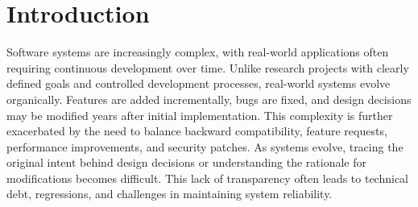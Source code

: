 \documentclass[sigconf,review,anonymous]{acmart}
\begin{document}




\maketitle

\section{Introduction}

Software systems are increasingly complex, with real-world applications often requiring continuous development over time. Unlike research projects with clearly defined goals and controlled development processes, real-world systems evolve organically. Features are added incrementally, bugs are fixed, and design decisions may be modified years after initial implementation. This complexity is further exacerbated by the need to balance backward compatibility, feature requests, performance improvements, and security patches. As systems evolve, tracing the original intent behind design decisions or understanding the rationale for modifications becomes difficult. This lack of transparency often leads to technical debt, regressions, and challenges in maintaining system reliability.
\end{document}
